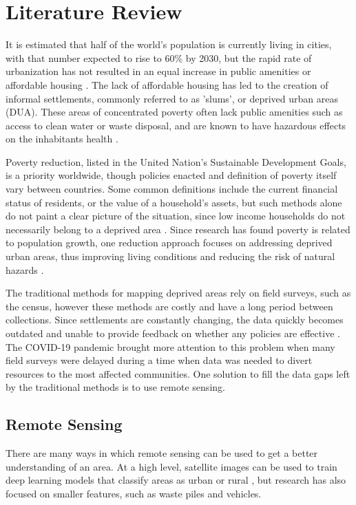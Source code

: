 \documentclass[conference]{IEEEtran}
\begin{document}
	\section{Literature Review}
		It is estimated that half of the world's population is currently living in cities, with that number expected to rise to 60\% by 2030, but the rapid rate of urbanization has not resulted in an equal increase in public amenities or affordable housing \cite{UN_Sustanability_Report}.
		The lack of affordable housing has led to the creation of informal settlements, commonly referred to as 'slums', or deprived urban areas (DUA).
		These areas of concentrated poverty often lack public amenities such as access to clean water or waste disposal, and are known to have hazardous effects on the inhabitants health \cite{Georgano_Stefanos_2021}.
		
		Poverty reduction, listed in the United Nation's Sustainable Development Goals, is a priority worldwide, though policies enacted and definition of poverty itself vary between countries.
		Some common definitions include the current financial status of residents, or the value of a household's assets, but such methods alone do not paint a clear picture of the situation, since low income households do not necessarily belong to a deprived area \cite{Merodio_Paloma_2021}. 
		Since research has found poverty is related to population growth, one reduction approach focuses on addressing deprived urban areas, thus improving living conditions and reducing the risk of natural hazards \cite{Lin_Li_2021}.
		
		The traditional methods for mapping deprived areas rely on field surveys, such as the census, however these methods are costly and have a long period between collections.
		Since settlements are constantly changing, the data quickly becomes outdated and unable to provide feedback on whether any policies are effective \cite{Williams_Trecia_2020}.
		The COVID-19 pandemic brought more attention to this problem when many field surveys were delayed during a time when data was needed to divert resources to the most affected communities.
		One solution to fill the data gaps left by the traditional methods is to use remote sensing.
		
	\subsection{Remote Sensing}
		There are many ways in which remote sensing can be used to get a better understanding of an area.
		At a high level, satellite images can be used to train deep learning models that classify areas as urban or rural \cite{Guo_Jinxin_2019}, but research has also focused on smaller features, such as waste piles and vehicles.
		
\end{document}
